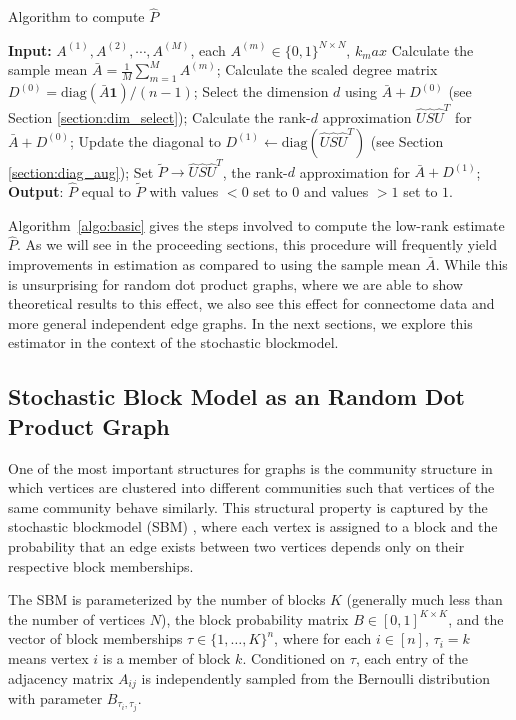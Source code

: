\documentclass[a4paper]{article}
\begin{document}
\begin{algorithm}[H]
\caption{Algorithm to compute $\hat{P}$}
\label{algo:basic}
\begin{algorithmic}[1]
\STATE \textbf{Input:} $A^{(1)}, A^{(2)}, \cdots, A^{(M)}$, each $A^{(m)} \in \{0,1\}^{N \times N}$, $k_max$
\STATE Calculate the sample mean $\bar{A} = \frac{1}{M}\sum\limits_{m = 1}^M A^{(m)}$;
\STATE Calculate the scaled degree matrix $D^{(0)} = \mathrm{diag}(\bar{A} \bm{1})/(n-1)$;
\STATE Select the dimension $d$  using $\bar{A} + D^{(0)}$ (see Section \ref{section:dim_select});
\STATE Calculate the rank-$d$ approximation $\hat{U} \hat{S} \hat{U}^T$ for $\bar{A} + D^{(0)}$;
\STATE Update the diagonal to $D^{(1)} \leftarrow \mathrm{diag}(\hat{U} \hat{S} \hat{U}^T)$ (see Section \ref{section:diag_aug}); 
\STATE Set $\tilde{P}\rightarrow\hat{U} \hat{S} \hat{U}^T$, the rank-$d$ approximation for $\bar{A} + D^{(1)}$;
\STATE \textbf{Output}: $\hat{P}$ equal to $\tilde{P}$ with values $<0$ set to $0$ and values $>1$ set to $1$.
\end{algorithmic}
\end{algorithm}


Algorithm~\ref{algo:basic} gives the steps involved to compute the low-rank estimate $\hat{P}$.
As we will see in the proceeding sections, this procedure will frequently yield improvements in estimation as compared to using the sample mean $\bar{A}$.
While this is unsurprising for random dot product graphs, where we are able to show theoretical results to this effect, we also see this effect for connectome data and more general independent edge graphs.
In the next sections, we explore this estimator in the context of the stochastic blockmodel.

\subsection{Stochastic Block Model as an Random Dot Product Graph}
\label{section:sbm_rdpg}
One of the most important structures for graphs is the community structure in which vertices are clustered into different communities such that vertices of the same community behave similarly. This structural property is captured by the stochastic blockmodel (SBM) \cite{holland1983stochastic}, where each vertex is assigned to a block and the probability that an edge exists between two vertices depends only on their respective block memberships.

The SBM is parameterized by the number of blocks $K$ (generally much less than the number of vertices $N$), the block probability matrix $B \in [0,1]^{K \times K}$, and the vector of block memberships
$\tau\in\{1,\dotsc,K\}^n$, where for each $i \in [n]$, $\tau_i = k$ means vertex $i$ is a member of block $k$.
Conditioned on $\tau$, each entry of the adjacency matrix $A_{ij}$ is independently sampled from the Bernoulli distribution with parameter $B_{\tau_i,\tau_j}$.
\end{document}
